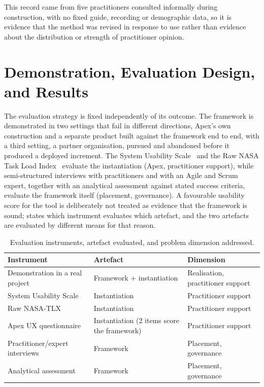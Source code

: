 \documentclass[sigconf,review=false]{acmart}
\begin{document}
This record came from five practitioners consulted informally during construction, with no fixed guide, recording or demographic data, so it is evidence that the method was revised in response to use rather than evidence about the distribution or strength of practitioner opinion.

\section{Demonstration, Evaluation Design, and Results}
\label{sec:evaluation}

The evaluation strategy is fixed independently of its outcome. The framework is demonstrated in two settings that fail in different directions, Apex's own construction and a separate product built against the framework end to end, with a third setting, a partner organisation, pursued and abandoned before it produced a deployed increment. The System Usability Scale~\cite{Brooke:1996SUS} and the Raw NASA Task Load Index~\cite{Hart:1988TLX, Hart:2006TLX} evaluate the instantiation (Apex, practitioner support), while semi-structured interviews with practitioners and with an Agile and Scrum expert, together with an analytical assessment against stated success criteria, evaluate the framework itself (placement, governance). A favourable usability score for the tool is deliberately not treated as evidence that the framework is sound;  states which instrument evaluates which artefact, and the two artefacts are evaluated by different means for that reason.

\begin{table}[H]
\centering
\caption{Evaluation instruments, artefact evaluated, and problem dimension addressed.}
\label{tab:instruments}
\footnotesize
\begin{tabular}{@{}p{2.5cm}p{2.3cm}p{1.9cm}@{}}
\toprule
\textbf{Instrument} & \textbf{Artefact} & \textbf{Dimension} \\
\midrule
Demonstration in a real project & Framework + instantiation & Realisation, practitioner support \\
System Usability Scale & Instantiation & Practitioner support \\
Raw NASA-TLX & Instantiation & Practitioner support \\
Apex UX questionnaire & Instantiation (2 items score the framework) & Practitioner support \\
Practitioner/expert interviews & Framework & Placement, governance \\
Analytical assessment & Framework & Placement, governance \\
\bottomrule
\end{tabular}
\end{table}
\end{document}
